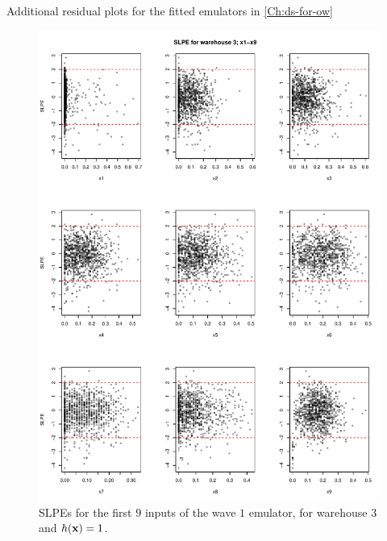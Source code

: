 \begin{chapter}{Additional residual plots  for the fitted emulators in \cref{Ch:ds-for-ow} \label{App:resid}}
\begin{figure}
  \includegraphics[width=\textwidth]{fig-app-ds/w1-w3-1.pdf}
  \caption{SLPEs for the first $9$ inputs of the wave $1$ emulator, for warehouse $3$ and $h(\mathbf{x}) = 1$.}
\end{figure}


\end{chapter}
